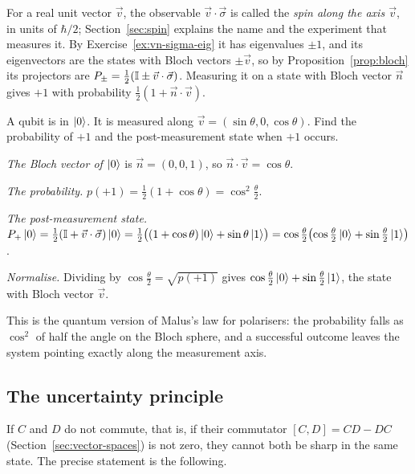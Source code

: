 For a real unit vector $\vec v$, the observable $\vec v\cdot\vec\sigma$ is called the \emph{spin along the axis $\vec v$}, in units of $\hbar/2$; Section~\ref{sec:spin} explains the name and the experiment that measures it. By Exercise~\ref{ex:vn-sigma-eig} it has eigenvalues $\pm1$, and its eigenvectors are the states with Bloch vectors $\pm\vec v$, so by Proposition~\ref{prop:bloch} its projectors are $P_\pm=\tfrac12(\mathbb{I}\pm\vec v\cdot\vec\sigma)$.
Measuring it on a state with Bloch vector $\vec n$ gives $+1$ with probability $\tfrac12(1+\vec n\cdot\vec v)$.

\begin{example}\label{ex:tilted}
  A qubit is in $\left|0\right\rangle$. It is measured along $\vec v=(\sin\theta,0,\cos\theta)$. Find the probability of $+1$ and the post-measurement state when $+1$ occurs.
\end{example}
\begin{solution}
  \begin{steps}
    \item \emph{The Bloch vector of $\left|0\right\rangle$} is $\vec n=(0,0,1)$, so $\vec n\cdot\vec v=\cos\theta$.
    \item \emph{The probability.} $p(+1)=\tfrac12(1+\cos\theta)=\cos^2\tfrac\theta2$.
    \item \emph{The post-measurement state.} $P_+\left|0\right\rangle=\tfrac12(\mathbb{I}+\vec v\cdot\vec\sigma)\left|0\right\rangle=\tfrac12\bigl((1+\cos\theta)\left|0\right\rangle+\sin\theta\left|1\right\rangle\bigr)=\cos\tfrac\theta2\bigl(\cos\tfrac\theta2\left|0\right\rangle+\sin\tfrac\theta2\left|1\right\rangle\bigr)$.
    \item \emph{Normalise.} Dividing by $\cos\frac\theta2=\sqrt{p(+1)}$ gives $\cos\tfrac\theta2\left|0\right\rangle+\sin\tfrac\theta2\left|1\right\rangle$, the state with Bloch vector $\vec v$.
  \end{steps}
  This is the quantum version of Malus's law for polarisers: the probability falls as $\cos^2$ of half the angle on the Bloch sphere, and a successful outcome leaves the system pointing exactly along the measurement axis.
\end{solution}

\subsection{The uncertainty principle}

If $C$ and $D$ do not commute, that is, if their commutator $[C,D]=CD-DC$ (Section~\ref{sec:vector-spaces}) is not zero, they cannot both be sharp in the same state. The precise statement is the following.

